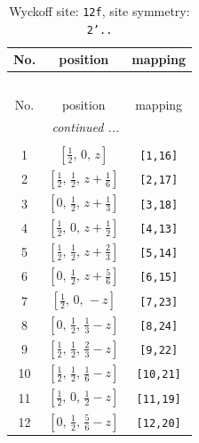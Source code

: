 \documentclass[fleqn,8pt]{jsarticle}
\begin{document}
\begin{longtable}{ccc}
\caption{Wyckoff site: {\tt 12f}, site symmetry: {\tt 2'..}}
 \\
 \hline \hline
No. & position & mapping \\ \hline \endfirsthead

\multicolumn{2}{l}{\tablename\ \thetable{}} \\
 \hline \hline
No. & position & mapping \\ \hline \endhead

 \hline \hline
\multicolumn{2}{r}{\footnotesize\it continued ...} \\ \endfoot

 \hline \hline
\multicolumn{2}{r}{} \\ \endlastfoot

1 & $\left[ \frac{1}{2},\, 0,\, z \right]$ & {\tt [1,16]} \\ \hline
2 & $\left[ \frac{1}{2},\, \frac{1}{2},\, z + \frac{1}{6} \right]$ & {\tt [2,17]} \\ \hline
3 & $\left[ 0,\, \frac{1}{2},\, z + \frac{1}{3} \right]$ & {\tt [3,18]} \\ \hline
4 & $\left[ \frac{1}{2},\, 0,\, z + \frac{1}{2} \right]$ & {\tt [4,13]} \\ \hline
5 & $\left[ \frac{1}{2},\, \frac{1}{2},\, z + \frac{2}{3} \right]$ & {\tt [5,14]} \\ \hline
6 & $\left[ 0,\, \frac{1}{2},\, z + \frac{5}{6} \right]$ & {\tt [6,15]} \\ \hline
7 & $\left[ \frac{1}{2},\, 0,\, - z \right]$ & {\tt [7,23]} \\ \hline
8 & $\left[ 0,\, \frac{1}{2},\, \frac{1}{3} - z \right]$ & {\tt [8,24]} \\ \hline
9 & $\left[ \frac{1}{2},\, \frac{1}{2},\, \frac{2}{3} - z \right]$ & {\tt [9,22]} \\ \hline
10 & $\left[ \frac{1}{2},\, \frac{1}{2},\, \frac{1}{6} - z \right]$ & {\tt [10,21]} \\ \hline
11 & $\left[ \frac{1}{2},\, 0,\, \frac{1}{2} - z \right]$ & {\tt [11,19]} \\ \hline
12 & $\left[ 0,\, \frac{1}{2},\, \frac{5}{6} - z \right]$ & {\tt [12,20]} \\
\end{longtable}
\renewcommand{\arraystretch}{1.2}
\end{document}
